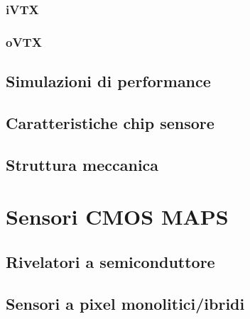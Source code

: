 \documentclass[10pt,a4paper,twoside]{report}
\begin{document}
\subsection{iVTX}

\subsection{oVTX}


\section{Simulazioni di performance}


\section{Caratteristiche chip sensore}



\section{Struttura meccanica}



\chapter{Sensori CMOS MAPS}


\section{Rivelatori a semiconduttore}

\section{Sensori a pixel monolitici/ibridi}
\end{document}

